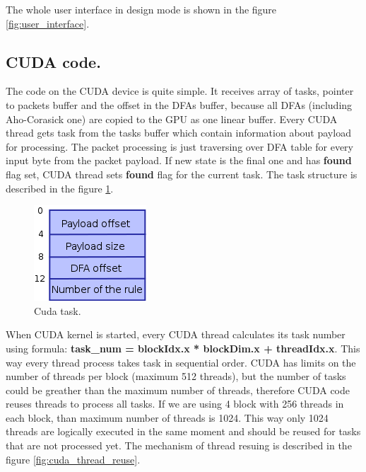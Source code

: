 \documentclass[thesis=M,english]{FITthesis}[2011/07/15]
\begin{document}
The whole user interface in design mode is shown in the figure \ref{fig:user_interface}.

\subsection{CUDA code.}
The code on the CUDA device is quite simple. It receives array of tasks, pointer to packets buffer and the offset in the DFAs buffer, because all DFAs (including Aho-Corasick one) are copied to the GPU as one linear buffer. Every CUDA thread gets task from the tasks buffer which contain information about payload for processing. The packet processing is just traversing over DFA table for every input byte from the packet payload. If new state is the final one and has \textbf{found} flag  set, CUDA thread sets \textbf{found} flag for the current task. The task structure is described in the figure \ref{fig:cuda_task}. 

\begin{figure}[h]
\centering
\includegraphics[scale=0.5]{images/cuda_task.png}
\caption{Cuda task.}
\label{fig:cuda_task}
\end{figure}

When CUDA kernel is started, every CUDA thread calculates its task number using formula: \textbf{task\_num = blockIdx.x * blockDim.x + threadIdx.x}. This way every thread process takes task in sequential order. CUDA has limits on the number of threads per block (maximum 512 threads), but the number of tasks could be greather than the maximum number of threads, therefore CUDA code reuses threads to process all tasks. If we are using 4 block with 256 threads in each block, than maximum number of threads is 1024. This way only 1024 threads are logically executed in the same moment and should be reused for tasks that are not processed yet. The mechanism of thread resuing is described in the figure \ref{fig:cuda_thread_reuse}.
\end{document}
